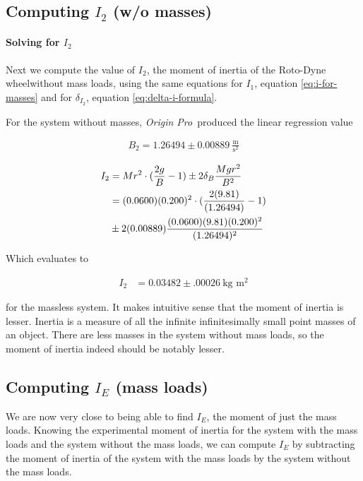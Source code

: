 \documentclass[coverpage]{article}
\newcommand{\softwareText}[1]{\textit{#1}\texttrademark}
\newcommand{\origin}{\softwareText{Origin Pro}}
\newcommand{\iUnit}{\text{kg $\text{m}^2$}}
\newcommand{\rwheel}{Roto-Dyne wheel}
\newcommand{\mpssq}{\frac{\text{m}}{\text{s}^2}}
\begin{document}
	\subsection{Computing $I_2$ (w/o masses)}
	
	\paragraph{Solving for $I_2$}
	
	Next we compute the value of $I_2$, the moment of inertia of the \rwheel without mass loads, using the same equations for $I_1$, equation \ref{eq:i-for-masses} and for $\delta_{I_2}$, equation \ref{eq:delta-i-formula}.
	
	For the system without masses, \origin~produced the linear regression value
	
	\begin{align}
		B_2 = 1.26494 \pm 0.00889\ \mpssq \label{eq:def-b2}
	\end{align}
	
	\begin{align}
		I_2 &= Mr^2 \cdot (\frac{2g}{B} - 1) \pm 2 \delta_B \frac{M g r^2}{B^2} \notag \\
		&= (0.0600)(0.200)^2 \cdot (\frac{2(9.81)}{(1.26494)} - 1) \notag \\
		&\pm 2 (0.00889) \frac{(0.0600) (9.81) (0.200)^2}{(1.26494)^2} \notag
	\end{align}

	Which evaluates to
	
	\begin{align}
		I_2 &= 0.03482 \pm .00026\ \iUnit
	\end{align}

	for the massless system. It makes intuitive sense that the moment of inertia is lesser. Inertia is a measure of all the infinite infinitesimally small point masses of an object. There are less masses in the system without mass loads, so the moment of inertia indeed should be notably lesser.
	
	\subsection{Computing $I_E$ (mass loads)}
	
	We are now very close to being able to find $I_E$, the moment of just the mass loads. Knowing the experimental moment of inertia for the system with the mass loads and the system without the mass loads, we can compute $I_E$ by subtracting the moment of inertia of the system with the mass loads by the system without the mass loads.
	
\end{document}
